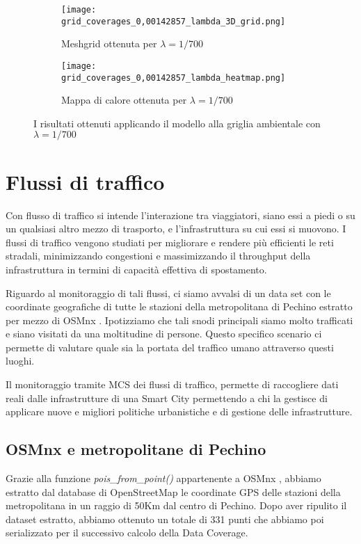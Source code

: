 \begin{figure}[H]
	\centering
	\begin{subfigure}[b]{\linewidth}
		\texttt{[image: grid\_coverages\_0,00142857\_lambda\_3D\_grid.png]}
		\caption{Meshgrid ottenuta per $\lambda = 1/700$}
	\end{subfigure}
	\begin{subfigure}[b]{\linewidth}
		\texttt{[image: grid\_coverages\_0,00142857\_lambda\_heatmap.png]}
		\caption{Mappa di calore ottenuta per $\lambda = 1/700$}
	\end{subfigure}
	\caption[Risultati griglia, $\lambda = 1/700$]{I risultati ottenuti applicando il modello alla griglia ambientale con $\lambda = 1/700$}
	\label{fig:grid_coverage3}
\end{figure}

\section{Flussi di traffico}
Con flusso di traffico si intende l'interazione tra viaggiatori, siano essi a piedi o su un qualsiasi altro mezzo di trasporto, e l'infrastruttura su cui essi si muovono.
I flussi di traffico vengono studiati per migliorare e rendere più efficienti le reti stradali, minimizzando congestioni e massimizzando il throughput della infrastruttura in termini di capacità effettiva di spostamento.

Riguardo al monitoraggio di tali flussi, ci siamo avvalsi di un data set con le coordinate geografiche di tutte le stazioni della metropolitana di Pechino estratto per mezzo di OSMnx \cite{osmnx}. Ipotizziamo che tali snodi principali siamo molto trafficati e siano visitati da una moltitudine di persone. Questo specifico scenario ci permette di valutare quale sia la portata del traffico umano attraverso questi luoghi. 

Il monitoraggio tramite MCS dei flussi di traffico, permette di raccogliere dati reali dalle infrastrutture di una Smart City permettendo a chi la gestisce di applicare nuove e migliori politiche urbanistiche e di gestione delle infrastrutture.

\subsection{OSMnx e metropolitane di Pechino}
Grazie alla funzione \textit{pois\_from\_point()} appartenente a OSMnx \cite{osmnx}, abbiamo estratto dal database di OpenStreetMap le coordinate GPS delle stazioni della metropolitana in un raggio di 50Km dal centro di Pechino.
Dopo aver ripulito il dataset estratto, abbiamo ottenuto un totale di 331 punti che abbiamo poi serializzato per il successivo calcolo della Data Coverage.

